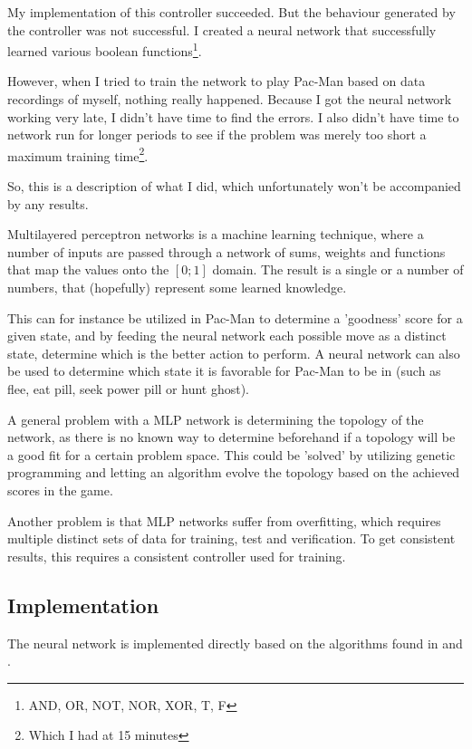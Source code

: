 My implementation of this controller succeeded. But the behaviour generated by the controller was not successful.
I created a neural network that successfully learned various boolean functions\footnote{AND, OR, NOT, NOR, XOR, T, F}.

However, when I tried to train the network to play Pac-Man based on data recordings of myself, nothing really happened. Because I got the neural network working very late, I didn't have time to find the errors. I also didn't have time to network run for longer periods to see if the problem was merely too short a maximum training time\footnote{Which I had at 15 minutes}.

So, this is a description of what I did, which unfortunately won't be accompanied by any results.

Multilayered perceptron networks is a machine learning technique, where a number of inputs are passed through a network of sums, weights and functions that map the values onto the $[0;1]$ domain. The result is a single or a number of numbers, that (hopefully) represent some learned knowledge.

This can for instance be utilized in Pac-Man to determine a 'goodness' score for a given state, and by feeding the neural network each possible move as a distinct state, determine which is the better action to perform. A neural network can also be used to determine which state it is favorable for Pac-Man to be in (such as flee, eat pill, seek power pill or hunt ghost).

A general problem with a MLP network is determining the topology of the network, as there is no known way to determine beforehand if a topology will be a good fit for a certain problem space. This could be 'solved' by utilizing genetic programming and letting an algorithm evolve the topology based on the achieved scores in the game.

Another problem is that MLP networks suffer from overfitting, which requires multiple distinct sets of data for training, test and verification. To get consistent results, this requires a consistent controller used for training.

\subsection*{Implementation}

The neural network is implemented directly based on the algorithms found in \cite{aima} and \cite{datamining}.

